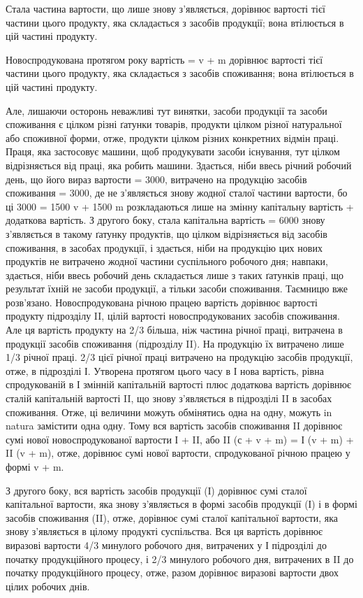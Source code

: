 Стала частина вартости, що лише знову з’являється, дорівнює вартості
тієї частини цього продукту, яка складається з засобів продукції;
вона втілюється в цій частині продукту.

Новоспродукована протягом року вартість = v + m дорівнює вартості
тієї частини цього продукту, яка складається з засобів споживання;
вона втілюється в цій частині продукту.

Але, лишаючи осторонь неважливі тут винятки, засоби продукції та
засоби споживання є цілком різні ґатунки товарів, продукти цілком різної
натуральної або споживної форми, отже, продукти цілком різних конкретних
відмін праці. Праця, яка застосовує машини, щоб продукувати
засоби існування, тут цілком відрізняється від праці, яка робить машини.
Здається, ніби ввесь річний робочий день, що його вираз вартости = 3000,
витрачено на продукцію засобів споживання = 3000, де не з’являється
знову жодної сталої частини вартости, бо ці 3000 = 1500 v + 1500 m
розкладаються лише на змінну капітальну вартість + додаткова вартість. З
другого боку, стала капітальна вартість = 6000 знову з’являється в такому
ґатунку продуктів, що цілком відрізняється від засобів споживання,
в засобах продукції, і здається, ніби на продукцію цих нових продуктів
не витрачено жодної частини суспільного робочого дня; навпаки, здається,
ніби ввесь робочий день складається лише з таких ґатунків праці, що
результат їхній не засоби продукції, а тільки засоби споживання. Таємницю
вже розв’язано. Новоспродукована річною працею вартість дорівнює
вартості продукту підрозділу II, цілій вартості новоспродукованих засобів
споживання. Але ця вартість продукту на 2/3 більша, ніж частина річної
праці, витрачена в продукції засобів споживання (підрозділу II). На продукцію
їх витрачено лише 1/3 річної праці. 2/3 цієї річної праці витрачено
на продукцію засобів продукції, отже, в підрозділі І. Утворена протягом
цього часу в І нова вартість, рівна спродукованій в І змінній капітальній
вартості плюс додаткова вартість дорівнює сталій капітальній вартості II,
що знову з’являється в підрозділі II в засобах споживання. Отже, ці величини
можуть обмінятись одна на одну, можуть in natura замістити одна одну.
Тому вся вартість засобів споживання II дорівнює сумі нової новоспродукованої
вартости І + II, або II (с + v + m) = І (v + m) + II (v + m), отже, дорівнює
сумі нової вартости, спродукованої річною працею у формі v + m.

З другого боку, вся вартість засобів продукції (І) дорівнює сумі сталої
капітальної вартости, яка знову з’являється в формі засобів продукції
(І) і в формі засобів споживання (II), отже, дорівнює сумі сталої
капітальної вартости, яка знову з’являється в цілому продукті суспільства.
Вся ця вартість дорівнює виразові вартости 4/3 минулого робочого дня,
витрачених у І підрозділі до початку продукційного процесу, і 2/3
минулого робочого дня, витрачених в II до початку продукційного процесу,
отже, разом дорівнює виразові вартости двох цілих робочих днів.

